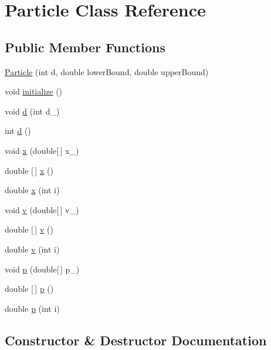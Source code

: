 \hypertarget{class_particle}{}\section{Particle Class Reference}
\label{class_particle}
\subsection*{Public Member Functions}
\begin{DoxyCompactItemize}
\item 
\hyperlink{class_particle_a064c9fe8249ad6ba0109159d9de78aa4}{Particle} (int d, double lower\+Bound, double upper\+Bound)
\item 
void \hyperlink{class_particle_a99f82d52c6e3e0454db2607f768f8cb3}{initialize} ()
\item 
void \hyperlink{class_particle_af3dcc5b859da72f9dc96f377a0043879}{d} (int d\+\_\+)
\item 
int \hyperlink{class_particle_ac4efb92ddb9203e588236968d8b7b9be}{d} ()
\item 
void \hyperlink{class_particle_a9de71f4a28c9c9716b0dce34bd8e2aa9}{x} (double\mbox{[}$\,$\mbox{]} x\+\_\+)
\item 
double \mbox{[}$\,$\mbox{]} \hyperlink{class_particle_a4ae274d487a3565fa11d59206c45139d}{x} ()
\item 
double \hyperlink{class_particle_a1298e71228d20427caf49481cd1d0fdf}{x} (int i)
\item 
void \hyperlink{class_particle_ae2f3c637da6701fb0e48c574493f7ec1}{v} (double\mbox{[}$\,$\mbox{]} v\+\_\+)
\item 
double \mbox{[}$\,$\mbox{]} \hyperlink{class_particle_a82665a73d72400706763a8fe62a4b677}{v} ()
\item 
double \hyperlink{class_particle_aa7e430520821b6650d829f3b51752d01}{v} (int i)
\item 
void \hyperlink{class_particle_a400de2dff42fa47320ab321366842ff1}{p} (double\mbox{[}$\,$\mbox{]} p\+\_\+)
\item 
double \mbox{[}$\,$\mbox{]} \hyperlink{class_particle_add309fe038f8b01ffd812fd574dfeed9}{p} ()
\item 
double \hyperlink{class_particle_a3ffe07f8456b8f145631fe6e9ae01909}{p} (int i)
\end{DoxyCompactItemize}


\subsection{Constructor \& Destructor Documentation}
\mbox{\label{class_particle_a064c9fe8249ad6ba0109159d9de78aa4}} 
